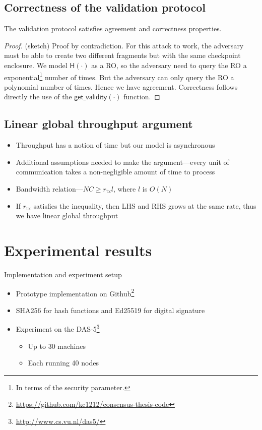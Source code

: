 \documentclass{beamer}
\begin{document}
\subsection{Correctness of the validation protocol}
\begin{frame}{\subsecname}
\begin{theorem}
  The validation protocol satisfies agreement and correctness properties.
\end{theorem}
\begin{proof}(sketch)
Proof by contradiction.
For this attack to work, the adversary must be able to create two different fragments but with the same checkpoint enclosure.
We model $\textsf{H}(\cdot)$ as a RO, so the adversary need to query the RO a exponential\footnote{In terms of the security parameter.} number of times.
But the adversary can only query the RO a polynomial number of times.
Hence we have agreement.
Correctness follows directly the use of the $\textsf{get\_validity}(\cdot)$ function.
\end{proof}
\end{frame}

\subsection{Linear global throughput argument}
\begin{frame}{\subsecname}
\begin{itemize}
  \item Throughput has a notion of time but our model is asynchronous
  \item Additional assumptions needed to make the argument---every unit of communication takes a non-negligible amount of time to process
  \item Bandwidth relation---$NC \ge r_{\text{tx}} l$, where $l$ is $O(N)$
  \item If $r_\text{tx}$ satisfies the inequality, then LHS and RHS grows at the same rate,
  thus we have linear global throughput
\end{itemize}
\end{frame}

\section{Experimental results}
\begin{frame}{Implementation and experiment setup}
  \begin{itemize}
    \item Prototype implementation on Github\footnote{\url{https://github.com/kc1212/consensus-thesis-code}}
    \item SHA256 for hash functions and Ed25519 for digital signature
    \item Experiment on the DAS-5\footnote{\url{http://www.cs.vu.nl/das5/}}
      \begin{itemize}
        \item Up to 30 machines
        \item Each running 40 nodes
      \end{itemize}
  \end{itemize}
\end{frame}
\end{document}
